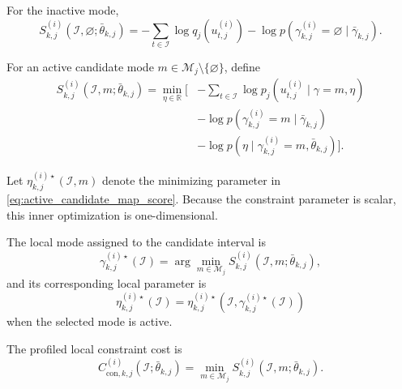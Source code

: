\documentclass[lettersize,journal]{IEEEtran}
\begin{document}
For the inactive mode,
\begin{equation}
S_{k,j}^{(i)}
\left(
\mathcal{I},\varnothing;
\bar{\theta}_{k,j}
\right)
=
-
\sum_{t\in\mathcal{I}}
\log q_j
\left(
u_{t,j}^{(i)}
\right)
-
\log
p
\left(
\gamma_{k,j}^{(i)}=\varnothing
\mid
\bar{\gamma}_{k,j}
\right).
\label{eq:inactive_candidate_map_score}
\end{equation}

For an active candidate mode
$m\in\mathcal{M}_j\setminus\{\varnothing\}$, define
\begin{equation}
\begin{aligned}
S_{k,j}^{(i)}
\left(
\mathcal{I},m;
\bar{\theta}_{k,j}
\right)
=
\min_{\eta\in\mathbb{R}}
\Bigg[
&
-
\sum_{t\in\mathcal{I}}
\log
p_j
\left(
u_{t,j}^{(i)}
\mid
\gamma=m,\eta
\right)
\\
&
-
\log
p
\left(
\gamma_{k,j}^{(i)}=m
\mid
\bar{\gamma}_{k,j}
\right)
\\
&
-
\log
p
\left(
\eta
\mid
\gamma_{k,j}^{(i)}=m,
\bar{\theta}_{k,j}
\right)
\Bigg].
\end{aligned}
\label{eq:active_candidate_map_score}
\end{equation}

Let
$\eta_{k,j}^{(i)\star}(\mathcal{I},m)$ denote the minimizing parameter in
\eqref{eq:active_candidate_map_score}. Because the constraint parameter is
scalar, this inner optimization is one-dimensional.

The local mode assigned to the candidate interval is
\begin{equation}
\gamma_{k,j}^{(i)\star}(\mathcal{I})
=
\arg\min_{m\in\mathcal{M}_j}
S_{k,j}^{(i)}
\left(
\mathcal{I},m;
\bar{\theta}_{k,j}
\right),
\label{eq:local_mode_map_selection}
\end{equation}
and its corresponding local parameter is
\begin{equation}
\eta_{k,j}^{(i)\star}(\mathcal{I})
=
\eta_{k,j}^{(i)\star}
\left(
\mathcal{I},
\gamma_{k,j}^{(i)\star}(\mathcal{I})
\right)
\label{eq:local_parameter_map_selection}
\end{equation}
when the selected mode is active.

The profiled local constraint cost is
\begin{equation}
C_{\mathrm{con},k,j}^{(i)}
\left(
\mathcal{I};
\bar{\theta}_{k,j}
\right)
=
\min_{m\in\mathcal{M}_j}
S_{k,j}^{(i)}
\left(
\mathcal{I},m;
\bar{\theta}_{k,j}
\right).
\label{eq:profiled_local_constraint_cost}
\end{equation}
\end{document}
